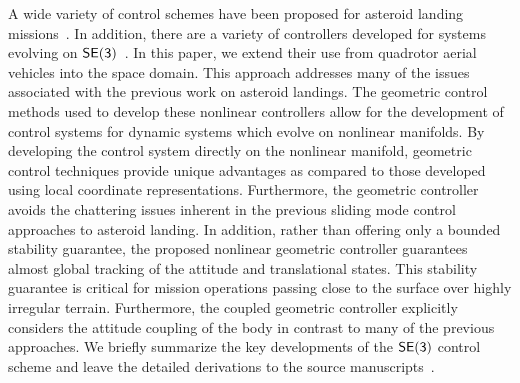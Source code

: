 \documentclass[letterpaper, paper,11pt]{AAS}		%
\begin{document}
A wide variety of control schemes have been proposed for asteroid landing missions~\cite{furfaro2013,li2011a}.
In addition, there are a  variety of controllers developed for systems evolving on \( \mathsf{SE(3)} \)~\cite{lee2010,lee2013}.
In this paper, we extend their use from quadrotor aerial vehicles into the space domain. 
This approach addresses many of the issues associated with the previous work on asteroid landings.
The geometric control methods used to develop these nonlinear controllers allow for the development of control systems for dynamic systems which evolve on nonlinear manifolds. 
By developing the control system directly on the nonlinear manifold, geometric control techniques provide unique advantages as compared to those developed using local coordinate representations.
Furthermore, the geometric controller avoids the chattering issues inherent in the previous sliding mode control approaches to asteroid landing.
In addition, rather than offering only a bounded stability guarantee, the proposed nonlinear geometric controller guarantees almost global tracking of the attitude and translational states. 
This stability guarantee is critical for mission operations passing close to the surface over highly irregular terrain.
Furthermore, the coupled geometric controller explicitly considers the attitude coupling of the body in contrast to many of the previous approaches.
We briefly summarize the key developments of the \( \mathsf{SE(3)} \) control scheme and leave the detailed derivations to the source manuscripts~\cite{lee2010,lee2013}.
\end{document}
